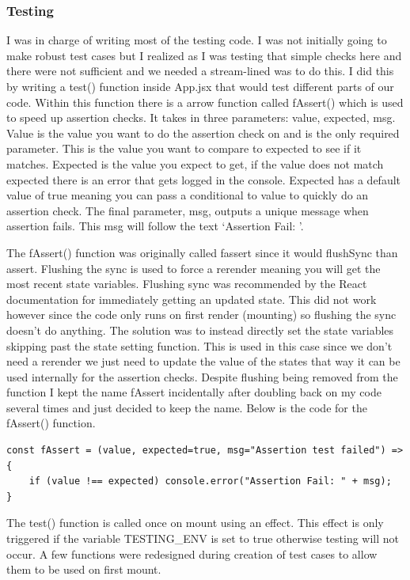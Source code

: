 \documentclass{article}[12pt]
\begin{document}
\subsubsection{Testing}
I was in charge of writing most of the testing code. I was not initially going to make robust test cases but I realized as I was testing that simple checks here and there were not sufficient and we needed a stream-lined was to do this. I did this by writing a test() function inside App.jsx that would test different parts of our code. Within this function there is a arrow function called fAssert() which is used to speed up assertion checks. It takes in three parameters: value, expected, msg. Value is the value you want to do the assertion check on and is the only required parameter. This is the value you want to compare to expected to see if it matches. Expected is the value you expect to get, if the value does not match expected there is an error that gets logged in the console. Expected has a default value of true meaning you can pass a conditional to value to quickly do an assertion check. The final parameter, msg, outputs a unique message when assertion fails. This msg will follow the text `Assertion Fail: '.

The fAssert() function was originally called fassert since it would flushSync than assert. Flushing the sync is used to force a rerender meaning you will get the most recent state variables. Flushing sync was recommended by the React documentation for immediately getting an updated state. This did not work however since the code only runs on first render (mounting) so flushing the sync doesn't do anything. The solution was to instead directly set the state variables skipping past the state setting function. This is used in this case since we don't need a rerender we just need to update the value of the states that way it can be used internally for the assertion checks. Despite flushing being removed from the function I kept the name fAssert incidentally after doubling back on my code several times and just decided to keep the name. Below is the code for the fAssert() function.

\begin{lstlisting}
const fAssert = (value, expected=true, msg="Assertion test failed") => {
    if (value !== expected) console.error("Assertion Fail: " + msg);
}
\end{lstlisting}


The test() function is called once on mount using an effect. This effect is only triggered if the variable TESTING\_ENV is set to true otherwise testing will not occur. A few functions were redesigned during creation of test cases to allow them to be used on first mount.
\end{document}
